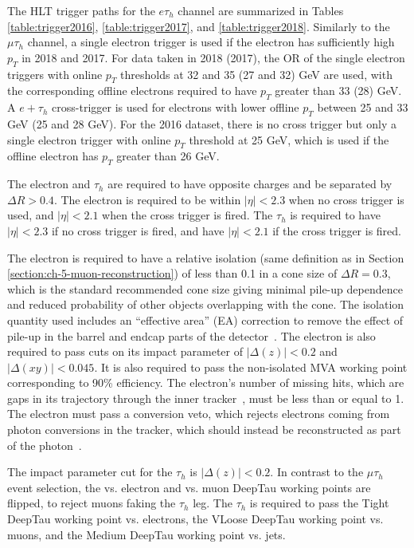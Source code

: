 The HLT trigger paths for the $e\tau_{h}$ channel are summarized in Tables \ref{table:trigger2016}, \ref{table:trigger2017}, and \ref{table:trigger2018}. Similarly to the $\mu\tau_{h}$ channel, a single electron trigger is used if the electron has sufficiently high $p_{T}$ in 2018 and 2017. For data taken in 2018 (2017), the OR of the single electron triggers with online $p_{T}$ thresholds at 32 and 35 (27 and 32) GeV are used, with the corresponding offline electrons required to have $p_{T}$ greater than 33 (28) GeV. A $e + \tau_{h}$ cross-trigger is used for electrons with lower offline $p_{T}$ between 25 and 33 GeV (25 and 28 GeV). For the 2016 dataset, there is no cross trigger but only a single electron trigger with online $p_{T}$ threshold at 25 GeV, which is used if the offline electron has $p_{T}$ greater than 26 GeV.

The electron and $\tau_h$ are required to have opposite charges and be separated by $\Delta R > 0.4$. The electron is required to be within $|\eta| < 2.3$ when no cross trigger is used, and $|\eta| < 2.1$ when the cross trigger is fired. The $\tau_{h}$ is required to have $|\eta| < 2.3$ if no cross trigger is fired, and have $|\eta| < 2.1$ if the cross trigger is fired.

The electron is required to have a relative isolation (same definition as in Section \ref{section:ch-5-muon-reconstruction}) of less than 0.1 in a cone size of $\Delta R = 0.3$, which is the standard recommended cone size giving minimal pile-up dependence and reduced probability of other objects overlapping with the cone. The isolation quantity used includes an ``effective area'' (EA) correction to remove the effect of pile-up in the barrel and endcap parts of the detector~\cite{twiki_EGamma_cutbased_ID_info}. The electron is also required to pass cuts on its impact parameter of $|\Delta(z)| < 0.2$ and $|\Delta(xy)| < 0.045$. It is also required to pass the non-isolated MVA working point corresponding to 90\% efficiency. The electron's number of missing hits, which are gaps in its trajectory through the inner tracker~\cite{twiki_EGamma_cutbased_ID_info}, must be less than or equal to 1. The electron must pass a conversion veto, which rejects electrons coming from photon conversions in the tracker, which should instead be reconstructed as part of the photon~\cite{twiki_EGamma_cutbased_ID_info}.

The impact parameter cut for the $\tau_h$ is $|\Delta(z)| < 0.2$. In contrast to the $\mu\tau_{h}$ event selection, the vs. electron and vs. muon DeepTau working points are flipped, to reject muons faking the $\tau_{h}$ leg. The $\tau_h$ is required to pass the Tight DeepTau working point vs. electrons, the VLoose DeepTau working point vs. muons, and the Medium DeepTau working point vs. jets.


